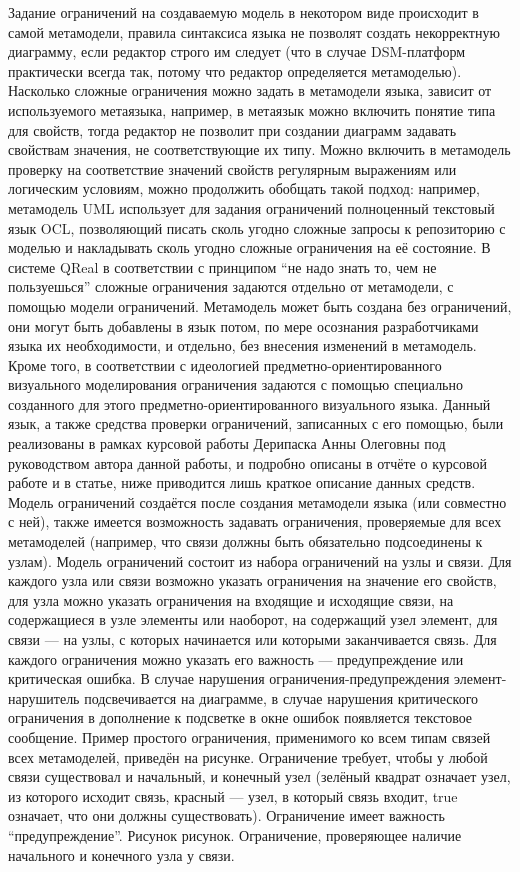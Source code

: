 	Задание ограничений на создаваемую модель в некотором виде происходит в самой метамодели, правила синтаксиса языка не позволят создать некорректную диаграмму, если редактор строго им следует (что в случае DSM-платформ практически всегда так, потому что редактор определяется метамоделью). Насколько сложные ограничения можно задать в метамодели языка, зависит от используемого метаязыка, например, в метаязык можно включить понятие типа для свойств, тогда редактор не позволит при создании диаграмм задавать свойствам значения, не соответствующие их типу. Можно включить в метамодель проверку на соответствие значений свойств регулярным выражениям или логическим условиям, можно продолжить обобщать такой подход: например, метамодель UML использует для задания ограничений полноценный текстовый язык OCL, позволяющий писать сколь угодно сложные запросы к репозиторию с моделью и накладывать сколь угодно сложные ограничения на её состояние.
	В системе QReal в соответствии с принципом “не надо знать то, чем не пользуешься” сложные ограничения задаются отдельно от метамодели, с помощью модели ограничений. Метамодель может быть создана без ограничений, они могут быть добавлены в язык потом, по мере осознания разработчиками языка их необходимости, и отдельно, без внесения изменений в метамодель. Кроме того, в соответствии с идеологией предметно-ориентированного визуального моделирования ограничения задаются с помощью специально созданного для этого предметно-ориентированного визуального языка. Данный язык, а также средства проверки ограничений, записанных с его помощью, были реализованы в рамках курсовой работы Дерипаска Анны Олеговны под руководством автора данной работы, и подробно описаны в отчёте о курсовой работе и в статье, ниже приводится лишь краткое описание данных средств.
	Модель ограничений создаётся после создания метамодели языка (или совместно с ней), также имеется возможность задавать ограничения, проверяемые для всех метамоделей (например, что связи должны быть обязательно подсоединены к узлам). Модель ограничений состоит из набора ограничений на узлы и связи. Для каждого узла или связи возможно указать ограничения на значение его свойств, для узла можно указать ограничения на входящие и исходящие связи, на содержащиеся в узле элементы или наоборот, на содержащий узел элемент, для связи --- на узлы, с которых начинается или которыми заканчивается связь. Для каждого ограничения можно указать его важность --- предупреждение или критическая ошибка. В случае нарушения ограничения-предупреждения элемент-нарушитель подсвечивается на диаграмме, в случае нарушения критического ограничения в дополнение к подсветке в окне ошибок появляется текстовое сообщение. 
Пример простого ограничения, применимого ко всем типам связей всех метамоделей, приведён на рисунке. Ограничение требует, чтобы у любой связи существовал и начальный, и конечный узел (зелёный квадрат означает узел, из которого исходит связь, красный --- узел, в который связь входит, true означает, что они должны существовать). Ограничение имеет важность “предупреждение”.
Рисунок рисунок. Ограничение, проверяющее наличие начального и конечного узла у связи.

